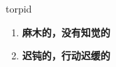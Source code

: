
\begin{frame}
{\huge torpid}
\begin{center}
\begin{enumerate}\Large
  \item \textbf{麻木的，没有知觉的}
  \item \textbf{迟钝的，行动迟缓的}
\end{enumerate}
\end{center}
\end{frame}
